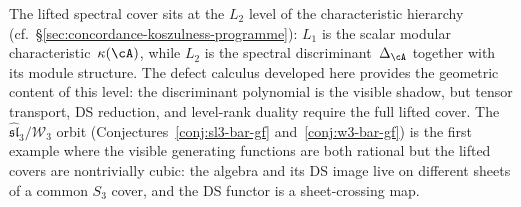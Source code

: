 \begin{remark}
\label{rem:spectral-shadow-position}
The lifted spectral cover sits at the $L_2$ level of the
characteristic hierarchy
(cf.~\S\ref{sec:concordance-koszulness-programme}): $L_1$ is the scalar
modular characteristic~$\kappa(\cA)$, while $L_2$ is the
spectral discriminant~$\Delta_\cA$ together with its module
structure.  The defect calculus developed here provides the
geometric content of this level: the discriminant polynomial is
the visible shadow, but tensor transport, DS reduction, and
level-rank duality require the full lifted cover.
The $\widehat{\mathfrak{sl}}_3/\mathcal{W}_3$ orbit
(Conjectures~\ref{conj:sl3-bar-gf}
and~\ref{conj:w3-bar-gf}) is the first example where the
visible generating functions are both rational but the lifted
covers are nontrivially cubic: the algebra and its DS image
live on different sheets of a common $S_3$ cover, and the DS
functor is a sheet-crossing map.
\end{remark}

